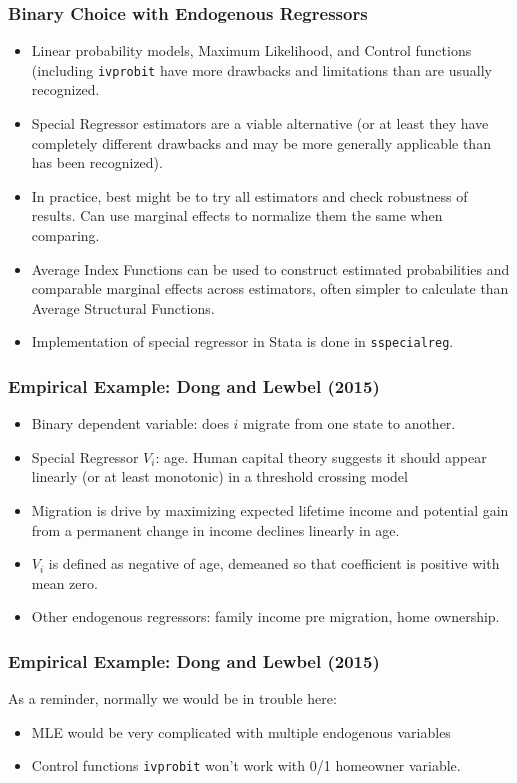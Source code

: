 \documentclass[11pt,dvipsnames,table,aspectratio=169]{beamer}
\begin{document}
\begin{frame}
\frametitle{Binary Choice with Endogenous Regressors}
\begin{itemize}
\item Linear probability models, Maximum Likelihood, and Control functions (including \texttt{ivprobit} have more drawbacks and limitations than are usually recognized.
\item Special Regressor estimators are a viable alternative (or at least they have completely different drawbacks and may be more generally applicable than has been recognized).
\item In practice, best might be to try all estimators and check robustness of results. Can use marginal effects to normalize them the same when comparing.
\item Average Index Functions can be used to construct estimated probabilities and comparable marginal effects across estimators, often simpler to calculate than Average Structural Functions.
\item Implementation of special regressor in Stata is done in \texttt{sspecialreg}.
\end{itemize}
\end{frame}

\begin{frame}
\frametitle{Empirical Example: Dong and Lewbel (2015)}
\begin{itemize}
\item Binary dependent variable: does $i$ migrate from one state to another. 
\item Special Regressor $V_i$: age. Human capital theory suggests it should appear linearly (or at least monotonic) in a threshold crossing model 
\item Migration is drive by maximizing expected lifetime income and potential gain from a permanent change in income declines linearly in age.
\item $V_i$ is defined as negative of age, demeaned so that coefficient is positive with mean zero.
\item Other endogenous regressors: family income pre migration, home ownership.
\end{itemize}
\end{frame}

\begin{frame}
\frametitle{Empirical Example: Dong and Lewbel (2015)}
As a reminder, normally we would be in trouble here:
\begin{itemize}
\item MLE would be very complicated with multiple endogenous variables
\item Control functions \texttt{ivprobit} won't work with 0/1 homeowner variable.
\end{itemize}
\end{frame}
\end{document}
